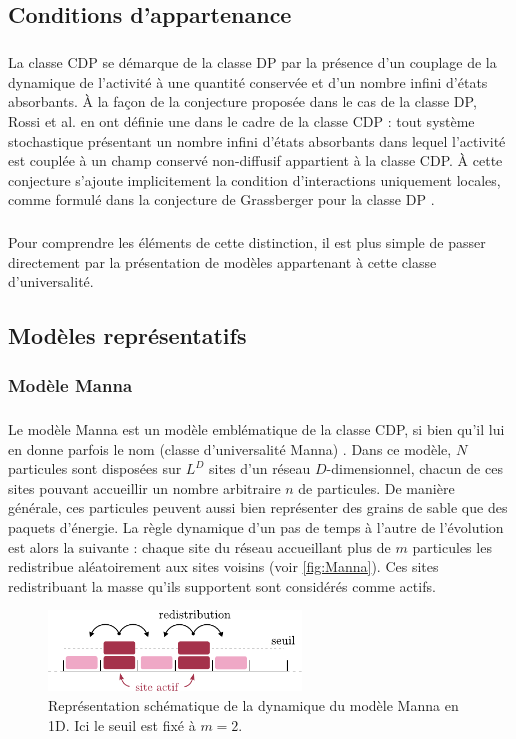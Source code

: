 \subsection{Conditions d'appartenance}

\subparagraph{}La classe CDP se démarque de la classe DP par la présence d'un couplage de la dynamique de l'activité à une quantité conservée et d'un nombre infini d'états absorbants. \`A la façon de la conjecture proposée dans le cas de la classe DP, Rossi et al. \cite{rossi_universality_2000} en ont définie une dans le cadre de la classe CDP : tout système stochastique présentant un nombre infini d'états absorbants dans lequel l'activité est couplée à un champ conservé non-diffusif appartient à la classe CDP. \`A cette conjecture s'ajoute implicitement la condition d'interactions uniquement locales, comme formulé dans la conjecture de Grassberger pour la classe DP \cite{grassberger_phase_1982}.

\subparagraph{}Pour comprendre les éléments de cette distinction, il est plus simple de passer directement par la présentation de modèles appartenant à cette classe d'universalité.

\subsection{Modèles représentatifs}

\label{sec:modelesCDP}

\subsubsection{Modèle Manna}

\subparagraph{}Le modèle Manna \cite{manna_two_state_1991} est un modèle emblématique de la classe CDP, si bien qu'il lui en donne parfois le nom (classe d'universalité Manna) \cite{lubeck_universal_2004}. Dans ce modèle, $N$ particules sont disposées sur $L^D$ sites d'un réseau $D$-dimensionnel, chacun de ces sites pouvant accueillir un nombre arbitraire $n$ de particules. De manière générale, ces particules peuvent aussi bien représenter des grains de sable que des paquets d'énergie. La règle dynamique d'un pas de temps à l'autre de l'évolution est alors la suivante : chaque site du réseau accueillant plus de $m$ particules les redistribue aléatoirement aux sites voisins (voir \autoref{fig:Manna}). Ces sites redistribuant la masse qu'ils supportent sont considérés comme actifs.

\begin{figure}[h]
\centering
\includegraphics[width=0.6\textwidth]{Chapitre1/Figures/CDP/Manna.pdf}
\caption{Représentation schématique de la dynamique du modèle Manna en 1D. Ici le seuil est fixé à $m=2$.}
\label{fig:Manna}
\end{figure}

